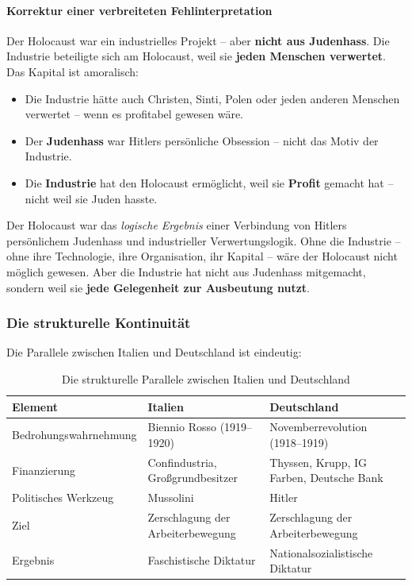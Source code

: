 \paragraph{Korrektur einer verbreiteten Fehlinterpretation}

Der Holocaust war ein industrielles Projekt – aber \textbf{nicht aus Judenhass}. Die Industrie beteiligte sich am Holocaust, weil sie \textbf{jeden Menschen verwertet}. Das Kapital ist amoralisch:

\begin{itemize}
    \item Die Industrie hätte auch Christen, Sinti, Polen oder jeden anderen Menschen verwertet – wenn es profitabel gewesen wäre.
    \item Der \textbf{Judenhass} war Hitlers persönliche Obsession – nicht das Motiv der Industrie.
    \item Die \textbf{Industrie} hat den Holocaust ermöglicht, weil sie \textbf{Profit} gemacht hat – nicht weil sie Juden hasste.
\end{itemize}

Der Holocaust war das \emph{logische Ergebnis} einer Verbindung von Hitlers persönlichem Judenhass und industrieller Verwertungslogik. Ohne die Industrie – ohne ihre Technologie, ihre Organisation, ihr Kapital – wäre der Holocaust nicht möglich gewesen. Aber die Industrie hat nicht aus Judenhass mitgemacht, sondern weil sie \textbf{jede Gelegenheit zur Ausbeutung nutzt}.

\subsubsection{Die strukturelle Kontinuität}

Die Parallele zwischen Italien und Deutschland ist eindeutig:

\begin{table}[ht]
\centering
\begin{tabular}{|l|l|p{5.5cm}|}
\hline
\textbf{Element} & \textbf{Italien} & \textbf{Deutschland} \\
\hline
Bedrohungswahrnehmung & Biennio Rosso (1919–1920) & Novemberrevolution (1918–1919) \\
\hline
Finanzierung & Confindustria, Großgrundbesitzer & Thyssen, Krupp, IG Farben, Deutsche Bank \\
\hline
Politisches Werkzeug & Mussolini & Hitler \\
\hline
Ziel & Zerschlagung der Arbeiterbewegung & Zerschlagung der Arbeiterbewegung \\
\hline
Ergebnis & Faschistische Diktatur & Nationalsozialistische Diktatur \\
\hline
\end{tabular}
\caption{Die strukturelle Parallele zwischen Italien und Deutschland}
\end{table}

